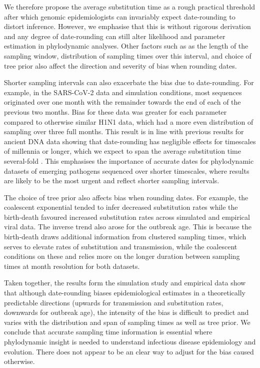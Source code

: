 \documentclass[12pt]{article}
\begin{document}
\begin{spacing}{2}
We therefore propose the average substitution time as a rough practical threshold after which genomic epidemiologists can invariably expect date-rounding to distort inference. However, we emphasise that this is without rigorous derivation and any degree of date-rounding can still alter likelihood and parameter estimation in phylodynamic analyses. Other factors such as as the length of the sampling window, distribution of sampling times over this interval, and choice of tree prior also affect the direction and severity of bias when rounding dates.

Shorter sampling intervals can also exacerbate the bias due to date-rounding. For example, in the SARS-CoV-2 data and simulation conditions, most sequences originated over one month with the remainder towards the end of each of the previous two months. Bias for these data was greater for each parameter compared to otherwise similar H1N1 data, which had a more even distribution of sampling over three full months. This result is in line with previous results for ancient DNA data showing that date-rounding has negligible effects for timescales of millennia or longer, which we expect to span the average substitution time several-fold \citep{molak_2013_phylogenetic}. This emphasises the importance of accurate dates for phylodynamic datasets of emerging pathogens sequenced over shorter timescales, where results are likely to be the most urgent and reflect shorter sampling intervals.

The choice of tree prior also affects bias when rounding dates. For example, the coalescent exponential tended to infer decreased substitution rates while the birth-death favoured increased substitution rates across simulated and empirical viral data. The inverse trend also arose for the outbreak age. This is because the birth-death draws additional information from clustered sampling times, which serves to elevate rates of substitution and transmission, while the coalescent conditions on these and relies more on the longer duration between sampling times at month resolution for both datasets. 

Taken together, the results form the simulation study and empirical data show that although date-rounding biases epidemiological estimates in a theoretically predictable directions (upwards for transmission and substitution rates, downwards for outbreak age), the intensity of the bias is difficult to predict and varies with the distribution and span of sampling times as well as tree prior. We conclude that accurate sampling time information is essential where phylodynamic insight is needed to understand infectious disease epidemiology and evolution. There does not appear to be an clear way to adjust for the bias caused otherwise. 


\end{spacing}
\end{document}
